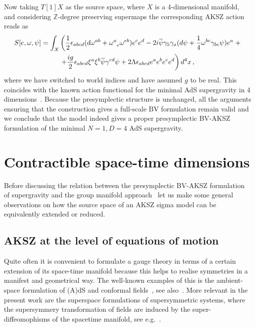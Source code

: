 \documentclass[a4paper,12pt]{article}
\numberwithin{equation}{section} %
\renewcommand{\hat}{\widehat}
\numberwithin{equation}{section}
\newcommand{\overbar}[1]{\mkern 1.5mu\overline{\mkern-1.5mu#1\mkern-1.5mu}\mkern 1.5mu}
\renewcommand{\wedge}{}
\newcommand{\psibar}{\overbar{\psi}}
\begin{document}
Now taking $T[1]X$ as the source space, where $X$ is a 4-dimensional manifold, and considering $\mathbb{Z}$-degree preserving supermaps  the corresponding AKSZ action reads as
\begin{multline}
    S[e,\omega,\psi] = \int_X\left( \frac{1}{2} \epsilon_{abcd} (d\omega^{ab} + \omega^a_{\enspace e} \wedge \omega^{eb})\wedge e^c \wedge e^d - 2i \overbar{\psi} \wedge \gamma_5 \gamma_a (d\psi + \frac{1}{4}\omega^{bc}\gamma_{bc}\wedge \psi) \wedge e^a \right.+\\
    \left.+\frac{ig}{2}\epsilon_{abcd}\xi^a\xi^b\psibar\gamma^{cd}\psi+2\Lambda\epsilon_{abcd}e^ae^be^ce^d\right) d^4x\,,
\end{multline}
where we have switched to world indices and have assumed $g$ to be real. This coincides with the known action functional for the minimal AdS supergravity in 4 dimensions~\cite{Castellani:1991eu}.  Because the presymplectic structure is unchanged, all the arguments ensuring that the construction gives a full-scale BV formulation remain valid and we conclude that the model indeed gives a proper presymplectic BV-AKSZ formulation of the minimal $N=1,D=4$ AdS supergravity.


\section{Contractible space-time dimensions}
\label{sec:contract}

Before discussing the relation between the presymplectic BV-AKSZ formulation of supergravity 
and the group manifold approach~\cite{DAuria:1982mkx,Castellani:1991eu} let us make some general observations on how the source space of an AKSZ sigma model can be equivalently extended or reduced. 

\subsection{AKSZ at the level of equations of motion}
\label{sec:source-ext-eom}

Quite often it is convenient to formulate a gauge theory in terms of a certain extension of its space-time manifold because this helps to realise symmetries in a manifest and geometrical way. The well-known examples of this is the ambient-space formulation of (A)dS and conformal fields~\cite{Dirac:1935zz,Dirac:1936fq}, see also~\cite{Bengtsson:1990un,Buchbinder:2001bs,Sagnotti:2003qa,Bonelli:2003zu,Barnich:2006pc,Bekaert:2009fg}. More relevant in the present work are the superspace formulations of supersymmetric systems, where the supersymmery transformation of fields are induced by the super-diffeomophisms of the spacetime manifold, see e.g.~\cite{Castellani:1991eu,Wess:1992cp,Buchbinder:1998qv,Freedman:2012zz}.
\end{document}
